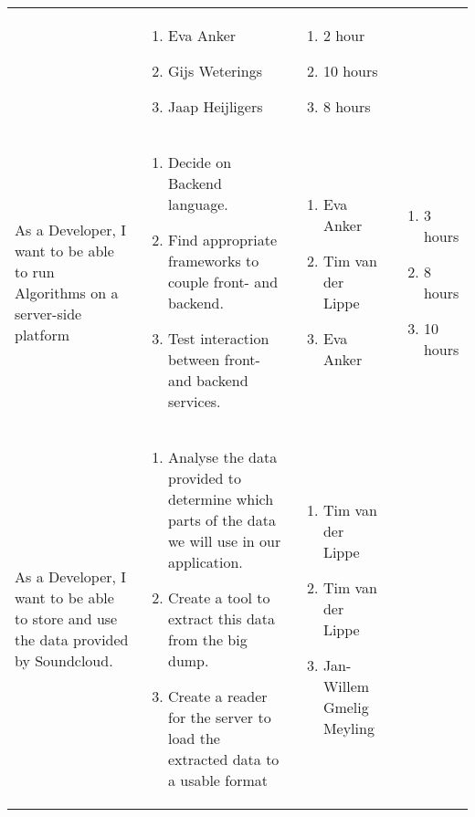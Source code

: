 \documentclass[11pt,a4paper]{article}
\begin{document}
\begin{table}[h]
\begin{tabular}{|p{4.5cm}|p{7cm}|p{4cm}|p{2.6cm}|}
& 
\begin{enumerate}
\item Eva Anker
\item Gijs Weterings
\item Jaap Heijligers
\end{enumerate}

& 
\begin{enumerate}
\item 2 hour
\item 10 hours
\item 8 hours
\end{enumerate} \\

As a Developer, I want to be able to run Algorithms on a server-side platform & \begin{enumerate}
\item Decide on Backend language.
\item Find appropriate frameworks to couple front- and backend.
\item Test interaction between front- and backend services.
\end{enumerate}

& 
\begin{enumerate}
\item Eva Anker
\item Tim van der Lippe
\item Eva Anker
\end{enumerate}

& 
\begin{enumerate}
\item 3 hours
\item 8 hours
\item 10 hours
\end{enumerate} \\

As a Developer, I want to be able to store and use the data provided by Soundcloud. & \begin{enumerate}
\item Analyse the data provided to determine which parts of the data we will use in our application.
\item Create a tool to extract this data from the big dump.
\item Create a reader for the server to load the extracted data to a usable format
\end{enumerate}

& 
\begin{enumerate}
\item Tim van der Lippe
\item Tim van der Lippe
\item Jan-Willem Gmelig Meyling
\end{enumerate}


\end{tabular}
\end{table}
\end{document}
